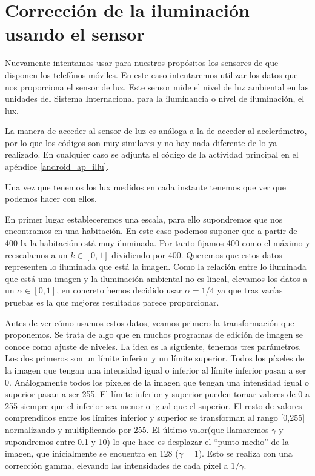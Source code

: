 \documentclass[a4paper,openright, 12pt]{book}
\begin{document}
\section{Corrección de la iluminación usando el sensor}
Nuevamente intentamos usar para nuestros propósitos los sensores de que disponen los telefónos móviles. En este caso intentaremos utilizar los datos que nos proporciona el sensor de luz. Este sensor mide el nivel de luz ambiental en las unidades del Sistema Internacional para la iluminancia o nivel de iluminación, el lux.

La manera de acceder al sensor de luz es análoga a la de acceder al acelerómetro, por lo que los códigos son muy similares y no hay nada diferente de lo ya realizado. En cualquier caso se adjunta el código de la actividad principal en el apéndice \ref{android_ap_illu}.

Una vez que tenemos los lux medidos en cada instante tenemos que ver que podemos hacer con ellos. 

En primer lugar estableceremos una escala, para ello supondremos que nos encontramos en una habitación. En este caso podemos suponer que a partir de 400 lx la habitación está muy iluminada. Por tanto fijamos 400 como el máximo y reescalamos a un  $k \in [0,1]$ dividiendo por 400. Queremos que estos datos representen lo iluminada que está la imagen. 
Como la relación entre lo iluminada que está una imagen y la iluminación ambiental no es lineal, elevamos los datos a un $\alpha  \in [0,1]$, en concreto hemos decidido usar  $\alpha = 1/4$ ya que tras varías pruebas es la que mejores resultados parece proporcionar.

Antes de ver cómo usamos estos datos, veamos primero la transformación que proponemos. Se trata de algo que en muchos programas de edición de imagen se conoce como ajuste de niveles. 
La idea es la siguiente, tenemos tres parámetros. Los dos primeros son un límite inferior y un límite superior.  Todos los píxeles de la imagen que tengan una intensidad igual o inferior al límite inferior pasan a ser 0. Análogamente todos los píxeles de la imagen que tengan una intensidad igual o superior pasan a ser 255. El límite inferior y superior pueden tomar valores de 0 a 255 siempre que el inferior sea menor o igual que el superior.
El resto de valores comprendidos entre los límites inferior y superior se transforman al rango [0,255] normalizando y multiplicando por 255.
El último valor(que llamaremos $\gamma$ y supondremos entre 0.1 y 10) lo que hace es desplazar el ``punto medio'' de la imagen, que inicialmente se encuentra en 128 ($\gamma=1$). Esto se realiza con una corrección gamma, elevando las intensidades de cada píxel a $1/\gamma$.
\end{document}
